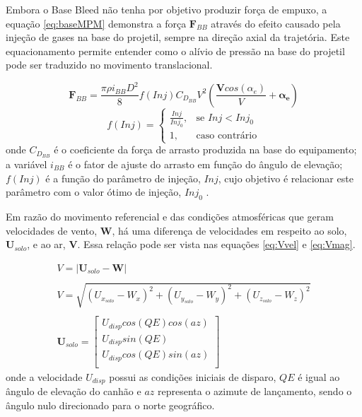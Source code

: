 Embora o Base Bleed não tenha por objetivo produzir força de empuxo, a equação \ref{eq:baseMPM} demonstra a força \(\textbf{F}_{BB}\) através do efeito causado pela injeção de gases na base do projetil, sempre na direção axial da trajetória. Este equacionamento permite entender como o alívio de pressão na base do projetil pode ser traduzido no movimento translacional.

\begin{equation} \label{eq:baseMPM}
    \boldsymbol{F}_{BB} = \frac{\pi \rho i_{BB} D^{2}}{8} f(Inj) C_{D_{BB}}V^{2} \left(\frac{\boldsymbol{V}cos(\alpha_{e})}{V} +\boldsymbol{\alpha_{e}}\right)
\end{equation}
%
\begin{equation}
f(Inj) =\begin{cases}
			\frac{Inj}{Inj_{0}}, & \text{se \(Inj < Inj_{0}\)}\\
            1, & \text{caso contrário}
		 \end{cases}
\end{equation}
%
onde \(C_{D_{BB}}\) é o coeficiente da força de arrasto produzida na base do equipamento; a variável \(i_{BB}\) é o fator de ajuste do arrasto em função do ângulo de elevação; \(f(Inj)\) é a função do parâmetro de injeção, \(Inj\), cujo objetivo é relacionar este parâmetro com o valor ótimo de injeção, \(Inj_{0}\) \cite{DAVENAS1993329}.

Em razão do movimento referencial e das condições atmosféricas que geram velocidades de vento, \(\boldsymbol{W}\), há uma diferença de velocidades em respeito ao solo, \(\boldsymbol{U}_{solo}\), e ao ar, \(\boldsymbol{V}\). Essa relação pode ser vista nas equações \ref{eq:Vvel} e \ref{eq:Vmag}.

\begin{gather}
    \label{eq:Vvel}
    V = |\boldsymbol{U}_{solo} - \boldsymbol{W}| \\ 
    \nonumber\\
    \label{eq:Vmag}
    V = \sqrt{(U_{x_{solo}}-W_{x})^2 + (U_{y_{solo}}-W_{y})^2 + (U_{z_{solo}}-W_{z})^2} \\
    \nonumber\\
    \label{eq:Uvec}
    \boldsymbol{U}_{solo} = \begin{bmatrix} 
        U_{disp}cos(QE)cos(az) \\
        U_{disp}sin(QE)\\
        U_{disp}cos(QE)sin(az) \\
    \end{bmatrix}
\end{gather}
%
onde a velocidade \(U_{disp}\) possui as condições iniciais de disparo, \(QE\) é igual ao ângulo de elevação do canhão e \(az\) representa o azimute de lançamento, sendo o ângulo nulo direcionado para o norte geográfico.

